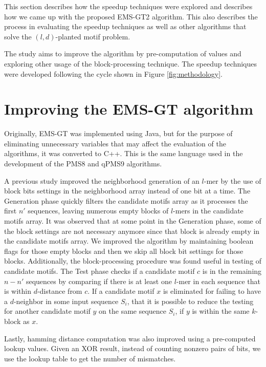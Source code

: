 This section describes how the speedup techniques were explored and describes how we came up with the proposed EMS-GT2 algorithm. This also describes the process in evaluating the speedup techniques as well as other algorithms that solve the $(l, d)$-planted motif problem.




The study aims to improve the algorithm by pre-computation of values and exploring other usage of the block-processing technique. The speedup techniques were developed following the cycle shown in Figure \ref{fig:methodology}.

\section{Improving the EMS-GT algorithm}
Originally, EMS-GT was implemented using Java, but for the purpose of eliminating unnecessary variables that may affect the evaluation of the algorithms, it was converted to C++. This is the same language used in the development of the PMS8 and qPMS9 algorithms.

A previous study \cite{sia2015} improved the neighborhood generation of an $l$-mer by the use of block bits settings in the neighborhood array instead of one bit at a time. The Generation phase quickly filters the candidate motifs array as it processes the first $n'$ sequences, leaving numerous empty blocks of $l$-mers in the candidate motifs array. It was observed that at some point in the Generation phase, some of the block settings are not necessary anymore since that block is already empty in the candidate motifs array. We improved the algorithm by maintaining boolean flags for those empty blocks and then we skip all block bit settings for those blocks. Additionally, the block-processing procedure was found useful in testing of candidate motifs. The Test phase checks if a candidate motif $c$ is in the remaining $n - n'$ sequences by comparing if there is at least one $l$-mer in each sequence that is within $d$-distance from $c$. If a candidate motif $x$ is eliminated for failing to have a $d$-neighbor in some input sequence $S_i$, that it is possible to reduce the testing for another candidate motif $y$ on the same sequence $S_i$, if $y$ is within the same $k$-block as $x$.

Lastly, hamming distance computation was also improved using a pre-computed lookup values. Given an XOR result, instead of counting nonzero pairs of bits, we use the lookup table to get the number of mismatches. 

